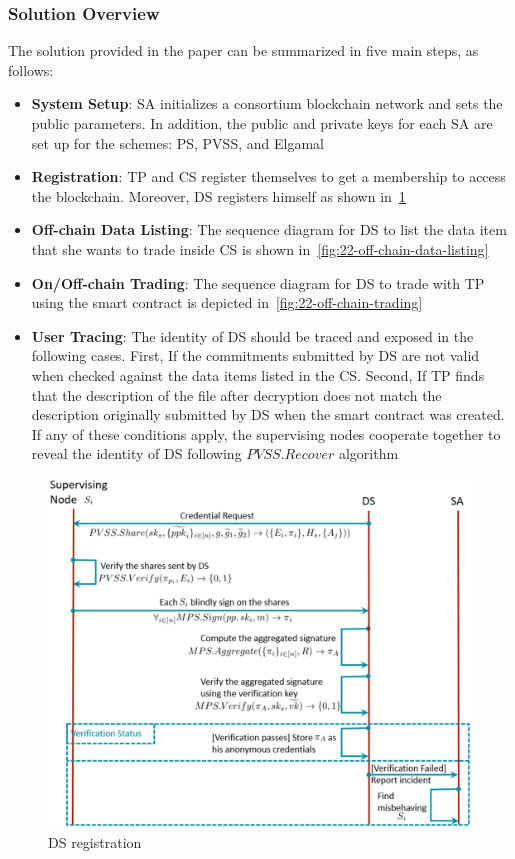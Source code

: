 \subsubsection{Solution Overview}
The solution provided in the paper can be summarized in five main steps, as follows:

\begin{itemize}
    \item \textbf{System Setup}: SA initializes a consortium blockchain network and sets the public parameters. 
    In addition, the public and private keys for each SA are set up for the schemes: PS, PVSS, and Elgamal
    \item \textbf{Registration}: TP and CS register themselves to get a membership to access the blockchain.
    Moreover, DS registers himself as shown in~\cref{fig:22-ds-registration}
    \item \textbf{Off-chain Data Listing}: The sequence diagram for DS to list the data item that she wants to trade inside CS is shown in~\cref{fig:22-off-chain-data-listing}
    \item \textbf{On/Off-chain Trading}: The sequence diagram for DS to trade with TP using the smart contract is depicted in~\cref{fig:22-off-chain-trading}
    \item \textbf{User Tracing}: The identity of DS should be traced and exposed in the following cases.
    First, If the commitments submitted by DS are not valid when checked against the data items listed in the CS.
    Second, If TP finds that the description of the file after decryption does not match the description originally submitted by DS when the smart contract was created.
    If any of these conditions apply, the supervising nodes cooperate together to reveal the identity of DS following $PVSS.Recover$ algorithm
\end{itemize}

\begin{figure}
\centering
  \includegraphics[width=1\linewidth]{imgs/22-sequenceRegisterDs.eps}
  \caption{DS registration}
  \label{fig:22-ds-registration}
\end{figure}

